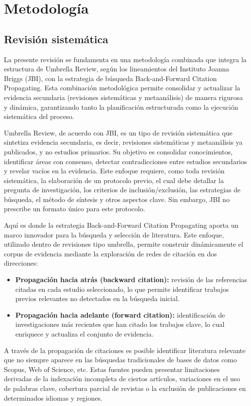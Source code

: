 \chapter{Metodología}
\section{Revisión sistemática}
La presente revisión se fundamenta en una metodología combinada que integra la estructura de
Umbrella Review, según los lineamientos del Instituto Joanna Briggs (JBI), con la estrategia de búsqueda
Back-and-Forward Citation Propagating. Esta combinación metodológica permite consolidar y actualizar
la evidencia secundaria (revisiones sistemáticas y metaanálisis) de manera rigurosa y dinámica, garantizando
tanto la planificación estructurada como la ejecución sistemática del proceso.

Umbrella Review, de acuerdo con JBI, es un tipo de revisión sistemática que sintetiza 
evidencia secundaria, es decir, revisiones sistemáticas y metaanálisis ya publicados, y no 
estudios primarios. Su objetivo es consolidar conocimientos, identificar áreas con consenso,
detectar contradicciones entre estudios secundarios y revelar vacíos en la evidencia. Este 
enfoque requiere, como toda revisión sistemática, la elaboración de un protocolo previo, 
el cual debe detallar la pregunta de investigación, los criterios de inclusión/exclusión, 
las estrategias de búsqueda, el método de síntesis y otros aspectos clave. Sin embargo, 
JBI no prescribe un formato único para este protocolo.

Aquí es donde la estrategia Back-and-Forward Citation Propagating aporta un marco innovador para la búsqueda
y selección de literatura. Este enfoque, utilizado dentro de revisiones tipo umbrella, permite construir
dinámicamente el corpus de evidencia mediante la exploración de redes de citación en dos direcciones:
\begin{itemize}
    \item \textbf{Propagación hacia atrás (backward citation):} revisión de las referencias citadas en cada estudio seleccionado, lo que permite identificar trabajos previos relevantes no detectados en la búsqueda inicial.
    \item \textbf{Propagación hacia adelante (forward citation):} identificación de investigaciones más recientes que han citado los trabajos clave, lo cual enriquece y actualiza el conjunto de evidencia.
\end{itemize}
A través de la propagación de citaciones es posible identificar literatura relevante que no siempre aparece en las búsquedas tradicionales de bases de datos como Scopus, Web of Science, etc.
Estas fuentes pueden presentar limitaciones derivadas de la indexación incompleta de ciertos artículos, variaciones en el uso de palabras clave, cobertura parcial de revistas o la exclusión de publicaciones en determinados idiomas y regiones.


